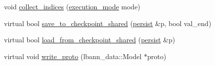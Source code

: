 \begin{DoxyCompactItemize}
\item 
void \hyperlink{classlbann_1_1model_aa819e0d7c8bb178155e40e33037cf054}{collect\+\_\+indices} (\hyperlink{base_8hpp_a2781a159088df64ed7d47cc91c4dc0a8}{execution\+\_\+mode} mode)
\item 
virtual bool \hyperlink{classlbann_1_1model_a3d589d2e46ad35d0a1221e25bef70fa4}{save\+\_\+to\+\_\+checkpoint\+\_\+shared} (\hyperlink{classlbann_1_1persist}{persist} \&p, bool val\+\_\+end)
\item 
virtual bool \hyperlink{classlbann_1_1model_a2e02dda11636e015ea0c892ffa541881}{load\+\_\+from\+\_\+checkpoint\+\_\+shared} (\hyperlink{classlbann_1_1persist}{persist} \&p)
\item 
virtual void \hyperlink{classlbann_1_1model_a488da86420421a4890c8fd7a95849acc}{write\+\_\+proto} (lbann\+\_\+data\+::\+Model $\ast$proto)
\end{DoxyCompactItemize}

